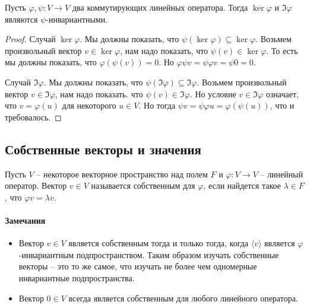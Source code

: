 
\begin{claim}\label{claim::KerImInvar}
Пусть $\varphi,\psi\colon V\to V$ два коммутирующих линейных оператора. Тогда $\ker \varphi$ и $\Im\varphi$ являются $\psi$-инвариантными.
\end{claim}
\begin{proof}
Случай $\ker \varphi$. Мы должны показать, что $\psi(\ker\varphi) \subseteq \ker \varphi$. Возьмем произвольный вектор $v\in \ker\varphi$, нам надо показать, что $\psi(v) \in \ker \varphi$. То есть мы должны показать, что $\varphi(\psi(v)) = 0$. Но $\varphi \psi v = \psi \varphi v = \psi 0 = 0$.

Случай $\Im \varphi$. Мы должны показать, что $\psi(\Im \varphi) \subseteq \Im \varphi$. Возьмем произвольный вектор $v\in \Im\varphi$, нам надо показать. что $\psi(v) \in \Im\varphi$. Но условие $v\in \Im \varphi$ означает, что $v = \varphi (u)$ для некоторого $u\in V$. Но тогда $\psi v = \psi \varphi u = \varphi (\psi(u))$, что и требовалось.
\end{proof}

\subsection{Собственные векторы и значения}

\begin{definition}
Пусть $V$ -- некоторое векторное пространство над полем $F$ и $\varphi \colon V\to V$ -- линейный оператор. Вектор $v\in V$ называется собственным для $\varphi$, если найдется такое $\lambda \in F$, что $\varphi v = \lambda v$.
\end{definition}

\paragraph{Замечания}

\begin{itemize}

\item Вектор $v\in V$ является собственным тогда и только тогда, когда $\langle v \rangle$ является $\varphi$-инвариантным подпространством. Таким образом изучать собственные векторы -- это то же самое, что изучать не более чем одномерные инвариантные подпространства. 

\item Вектор $0\in V$ всегда является собственным для любого линейного оператора.
\end{itemize}

